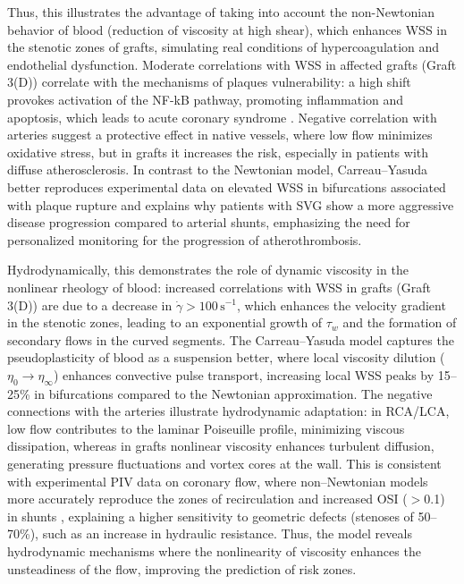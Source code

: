 ﻿\documentclass[12pt,a4paper]{article}
\theoremstyle{definition}
\numberwithin{equation}{section}
\begin{document}
Thus, this illustrates the advantage of taking into account the non-Newtonian behavior of blood (reduction of viscosity at high shear), which enhances WSS in the stenotic zones of grafts, simulating real conditions of hypercoagulation and endothelial dysfunction. Moderate correlations with WSS in affected grafts (Graft 3(D)) correlate with the mechanisms of plaques vulnerability: a high shift provokes activation of the NF-kB pathway, promoting inflammation and apoptosis, which leads to acute coronary syndrome \cite{10.1016/j.vph.2024.107452}. Negative correlation with arteries suggest a protective effect in native vessels, where low flow minimizes oxidative stress, but in grafts it increases the risk, especially in patients with diffuse atherosclerosis. In contrast to the Newtonian model, Carreau--Yasuda better reproduces experimental data on elevated WSS in bifurcations associated with plaque rupture \cite{10.3389/fphys.2025.1509875} and explains why patients with SVG show a more aggressive disease progression compared to arterial shunts, emphasizing the need for personalized monitoring for the progression of atherothrombosis.

Hydrodynamically, this demonstrates the role of dynamic viscosity in the nonlinear rheology of blood: increased correlations with WSS in grafts (Graft 3(D)) are due to a decrease in $\dot{\gamma} > 100 \,\text{s}^{-1}$, which enhances the velocity gradient in the stenotic zones, leading to an exponential growth of $\tau_w$ and the formation of secondary flows in the curved segments. The Carreau--Yasuda model captures the pseudoplasticity of blood as a suspension better, where local viscosity dilution ($\eta_0 \rightarrow \eta_\infty$) enhances convective pulse transport, increasing local WSS peaks by 15--25\% in bifurcations compared to the Newtonian approximation. The negative connections with the arteries illustrate hydrodynamic adaptation: in RCA/LCA, low flow contributes to the laminar Poiseuille profile, minimizing viscous dissipation, whereas in grafts nonlinear viscosity enhances turbulent diffusion, generating pressure fluctuations and vortex cores at the wall. This is consistent with experimental PIV data on coronary flow, where non--Newtonian models more accurately reproduce the zones of recirculation and increased OSI ($>$0.1) in shunts \cite{10.1016/j.jbiomech.2005.01.034}, explaining a higher sensitivity to geometric defects (stenoses of 50--70\%), such as an increase in hydraulic resistance. Thus, the model reveals hydrodynamic mechanisms where the nonlinearity of viscosity enhances the unsteadiness of the flow, improving the prediction of risk zones.
\end{document}
